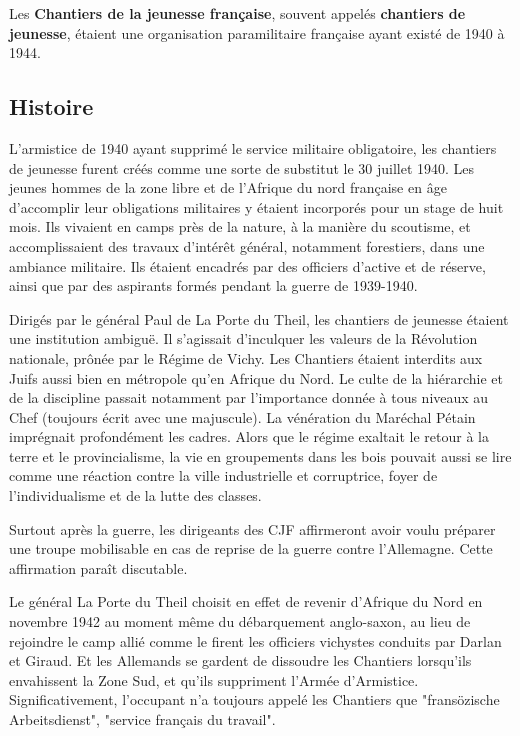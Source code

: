 



Les \textbf{Chantiers de la jeunesse française}, souvent appelés \textbf{chantiers de jeunesse}, étaient une organisation
paramilitaire française ayant existé de 1940 à 1944.

\subsection{Histoire}

L'armistice de 1940 ayant supprimé le service militaire obligatoire, les chantiers de jeunesse furent créés
comme une sorte de substitut le 30 juillet 1940. Les jeunes hommes de la zone libre et de l'Afrique du nord
française en âge d'accomplir leur obligations militaires y étaient incorporés pour un stage de huit mois. Ils
vivaient en camps près de la nature, à la manière du scoutisme, et accomplissaient des travaux d'intérêt
général, notamment forestiers, dans une ambiance militaire. Ils étaient encadrés par des officiers d'active et de
réserve, ainsi que par des aspirants formés pendant la guerre de 1939-1940.

Dirigés par le général Paul de La Porte du Theil, les chantiers de jeunesse étaient une institution ambiguë. Il
s'agissait d'inculquer les valeurs de la Révolution nationale, prônée par le Régime de Vichy. Les Chantiers
étaient interdits aux Juifs aussi bien en métropole qu'en Afrique du Nord. Le culte de la hiérarchie et de la
discipline passait notamment par l'importance donnée à tous niveaux au Chef (toujours écrit avec une
majuscule). La vénération du Maréchal Pétain imprégnait profondément les cadres. Alors que le régime
exaltait le retour à la terre et le provincialisme, la vie en groupements dans les bois pouvait aussi se lire
comme une réaction contre la ville industrielle et corruptrice, foyer de l'individualisme et de la lutte des
classes.

Surtout après la guerre, les dirigeants des CJF affirmeront avoir voulu préparer une troupe mobilisable en cas
de reprise de la guerre contre l'Allemagne. Cette affirmation paraît discutable.

Le général La Porte du Theil choisit en effet de revenir d'Afrique du Nord en novembre 1942 au moment
même du débarquement anglo-saxon, au lieu de rejoindre le camp allié comme le firent les officiers vichystes
conduits par Darlan et Giraud. Et les Allemands se gardent de dissoudre les Chantiers lorsqu'ils envahissent la
Zone Sud, et qu'ils suppriment l'Armée d'Armistice. Significativement, l'occupant n'a toujours appelé les
Chantiers que "fransözische Arbeitsdienst", "service français du travail".


